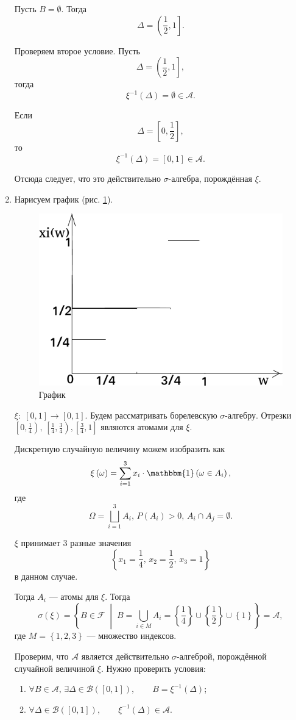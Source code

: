 \begin{enumerate}[label=\alph*)]
Пусть $B = \emptyset $.
Тогда
$$ \Delta =
\left( \frac{1}{2}, 1 \right]. $$

Проверяем второе условие.
Пусть
$$ \Delta =
\left( \frac{1}{2}, 1 \right],$$
тогда
$$ \xi^{-1} \left( \Delta \right) =
\emptyset \in
\mathcal{A}.$$

Если
$$ \Delta =
\left[ 0, \frac{1}{2} \right],$$
то
$$ \xi^{-1} \left( \Delta \right) =
\left[ 0, 1 \right] \in
\mathcal{A}.$$

Отсюда следует, что это действительно $ \sigma $-алгебра, порождённая $ \xi $.
\item Нарисуем график (рис. \ref{fig:8181}).

\begin{figure}[h!]
  \centering
  \includegraphics[width=.4\textwidth]{./pictures/8_18_1.png}
  \caption{График}
  \label{fig:8181}
\end{figure}

$ \xi: \; \left[ 0, 1 \right] \rightarrow \left[ 0, 1 \right] $.
Будем рассматривать борелевскую $ \sigma $-алгебру.
Отрезки
$ \left[ 0, \frac{1}{4} \right), \, \left[ \frac{1}{4}, \frac{3}{4} \right), \left[ \frac{3}{4}, 1 \right] $ являются атомами для $ \xi $.

Дискретную случайную величину можем изобразить как
$$ \xi \left( \omega \right) =
\sum \limits_{i=1}^3 x_i \cdot \mathbbm{1} \left( \omega \in A_i \right),$$
где
$$ \Omega =
\bigsqcup \limits_{i=1}^3 A_i, \,
P \left( A_i \right) > 0, \,
A_i \cap A_j =
\emptyset.$$

$ \xi $ принимает 3 разные значения
$$ \left\{ x_1 = \frac{1}{4}, \, x_2 = \frac{1}{2}, \, x_3 = 1 \right\} $$
в данном случае.

Тогда $A_i$ --- атомы для $ \xi $.
Тогда
$$ \sigma \left( \xi \right) =
\left\{ B \in \mathcal{F} \; \middle| \; B = \bigcup \limits_{i \in M} A_i = \left\{ \frac{1}{4} \right\} \cup \left\{ \frac{1}{2} \right\} \cup \left\{ 1 \right\} \right\} =
\mathcal{A},$$
где $M = \left\{ 1, 2, 3 \right\} $ --- множество индексов.

Проверим, что $ \mathcal{A} $ является действительно $ \sigma $-алгеброй, порождённой случайной величиной $ \xi $.
Нужно проверить условия:
\begin{enumerate}
\item $ \forall B \in \mathcal{A}, \, \exists \Delta \in \mathcal{B} \left( \left[ 0, 1 \right] \right), \qquad B = \xi^{-1} \left( \Delta \right) $;
\item $ \forall \Delta \in \mathcal{B} \left( \left[ 0, 1 \right] \right), \qquad \xi^{-1} \left( \Delta \right) \in \mathcal{A} $.
\end{enumerate}


\end{enumerate}

